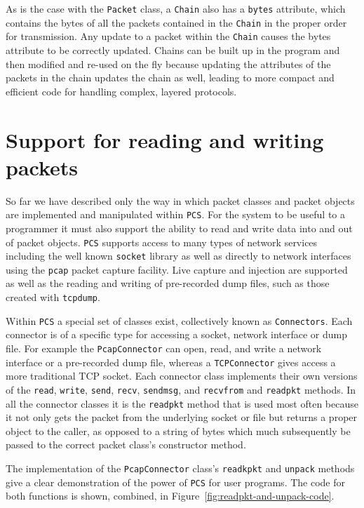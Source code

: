 \documentclass[pdftex]{article}
\begin{document}
As is the case with the \verb|Packet| class, a \verb|Chain| also has
a \verb|bytes| attribute, which contains the bytes of all the packets
contained in the \verb|Chain| in the proper order for transmission.
Any update to a packet within the \verb|Chain| causes the bytes
attribute to be correctly updated.  Chains can be built up in the
program and then modified and re-used on the fly because updating the
attributes of the packets in the chain updates the chain as well,
leading to more compact and efficient code for handling complex,
layered protocols.

\section{Support for reading and writing packets}
\label{sec:support-for-reading-and-writing}

So far we have described only the way in which packet classes and
packet objects are implemented and manipulated within \verb|PCS|.
For the system to be useful to a programmer it must also support the
ability to read and write data into and out of packet objects.
\verb|PCS| supports access to many types of network services
including the well known \verb|socket| library as well as directly
to network interfaces using the \verb|pcap| packet capture
facility.  Live capture and injection are supported as well as the
reading and writing of pre-recorded dump files, such as those created
with \verb|tcpdump|.

Within \verb|PCS| a special set of classes exist, collectively
known as \verb|Connectors|.  Each connector is of a specific type for
accessing a socket, network interface or dump file.  For example the
\verb|PcapConnector| can open, read, and write a network interface or
a pre-recorded dump file, whereas a \verb|TCPConnector| gives access
a more traditional TCP socket.  Each connector class implements their
own versions of the \verb|read|, \verb|write|, \verb|send|,
\verb|recv|, \verb|sendmsg|, and \verb|recvfrom| and
\verb|readpkt| methods.  In all the connector classes it is the
\verb|readpkt| method that is used most often because it not only
gets the packet from the underlying socket or file but returns a
proper object to the caller, as opposed to a string of bytes which
much subsequently be passed to the correct packet class's constructor
method.

The implementation of the \verb|PcapConnector| class's
\verb|readkpkt| and \verb|unpack| methods give a clear
demonstration of the power of \verb|PCS| for user programs.  The
code for both functions is shown, combined, in
Figure~\ref{fig:readpkt-and-unpack-code}.
\end{document}
